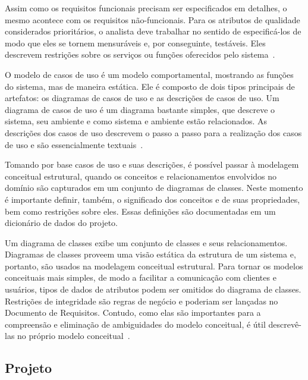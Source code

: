 Assim como os requisitos funcionais precisam ser especificados em detalhes, o mesmo acontece com os requisitos não-funcionais. Para os atributos de qualidade considerados prioritários, o analista deve trabalhar no sentido de especificá-los de modo que eles se tornem mensuráveis e, por conseguinte, testáveis. Eles descrevem restrições sobre os serviços ou funções oferecidos pelo sistema~\cite{sommerville}.

O modelo de casos de uso é um modelo comportamental, mostrando as funções do sistema, mas de maneira estática. Ele é composto de dois tipos principais de artefatos: os diagramas de casos de uso e as descrições de casos de uso. Um diagrama de casos de uso é um diagrama bastante simples, que descreve o sistema, seu ambiente e como sistema e ambiente estão relacionados. As descrições dos casos de uso descrevem o passo a passo para a realização dos casos de uso e são essencialmente textuais~\cite{falboEngReq}. 

Tomando por base casos de uso e suas descrições, é possível passar à modelagem conceitual estrutural, quando os conceitos e relacionamentos envolvidos no domínio são capturados em um conjunto de diagramas de classes. Neste momento é importante definir, também, o significado dos conceitos e de suas propriedades, bem como restrições sobre eles. Essas definições são documentadas em um dicionário de dados do projeto.

Um diagrama de classes exibe um conjunto de classes e seus relacionamentos. Diagramas de classes proveem uma visão estática da estrutura de um sistema e, portanto, são usados na modelagem conceitual estrutural. Para tornar os modelos conceituais mais simples, de modo a facilitar a comunicação com clientes e usuários, tipos de dados de atributos podem ser omitidos do diagrama de classes. Restrições de integridade são regras de negócio e poderiam ser lançadas no Documento de Requisitos. Contudo, como elas são importantes para a compreensão e eliminação de ambiguidades do modelo conceitual, é útil descrevê-las no próprio modelo conceitual~\cite{falboEngReq}. 





\subsection{Projeto}
\label{sec-referencial-engenharia-software-atividade-desenvolvimento-projeto}

